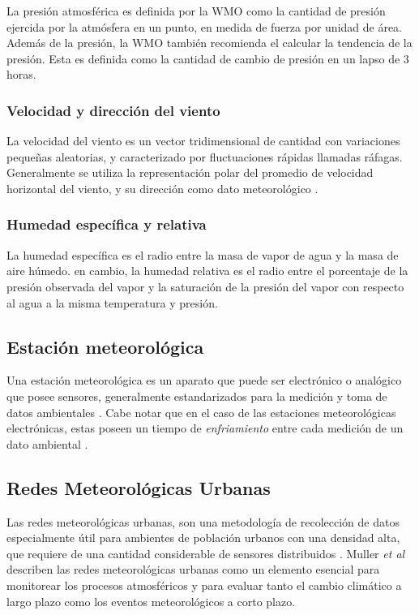 La presión atmosférica es definida por la WMO \cite{CIMO_2008} como la cantidad de presión ejercida por la atmósfera en un punto, en medida de fuerza por unidad de área. Además de la presión, la WMO también recomienda el calcular la tendencia de la presión. Esta es definida como la cantidad de cambio de presión en un lapso de 3 horas.

\subsubsection{Velocidad y dirección del viento}

La velocidad del viento es un vector tridimensional de cantidad con variaciones pequeñas aleatorias, y caracterizado por fluctuaciones rápidas llamadas ráfagas. Generalmente se utiliza la representación polar del promedio de velocidad horizontal del viento, y su dirección como dato meteorológico \cite{CIMO_2008}.

\subsubsection{Humedad específica y relativa}

La humedad específica es el radio entre la masa de vapor de agua y la masa de aire húmedo. en cambio, la humedad relativa es el radio entre el porcentaje de la presión observada del vapor y la saturación de la presión del vapor con respecto al agua a la misma temperatura y presión.

\subsection{Estación meteorológica}

Una estación meteorológica es un aparato que puede ser electrónico o analógico que posee sensores, generalmente estandarizados para la medición y toma de datos ambientales \cite{CIMO_2008}. Cabe notar que en el caso de las estaciones meteorológicas electrónicas, estas poseen un tiempo de \textit{enfriamiento} entre cada medición de un dato ambiental \cite{davis:6152C_6162C_SS}.

\subsection{Redes Meteorológicas Urbanas}

Las redes meteorológicas urbanas, son una metodología de recolección de datos especialmente útil para ambientes de población urbanos con una densidad alta, que requiere de una cantidad considerable de sensores distribuidos . Muller \textit{et al} \cite{doi:10.1002/joc.3678} describen las redes meteorológicas urbanas como un elemento esencial para monitorear los procesos atmosféricos y para evaluar tanto el cambio climático a largo plazo como los eventos meteorológicos a corto plazo.

